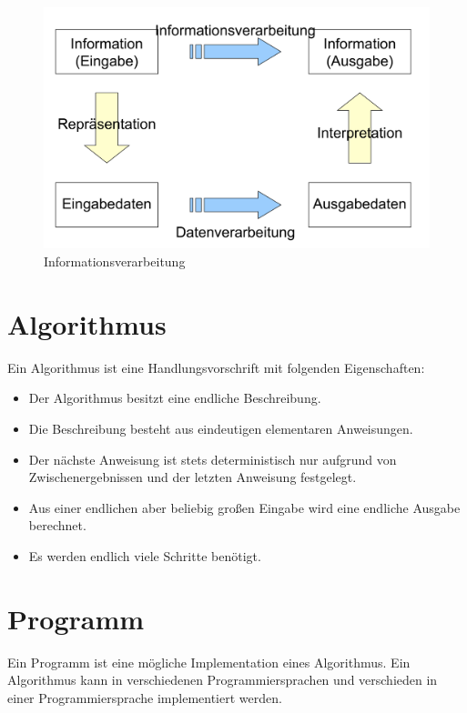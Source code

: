 \documentclass[../main.tex]{subfiles}
\begin{document}
        \begin{figure}
             \centering
             \includegraphics[width=\textwidth]{Abbildungen/Informationsverarbeitung.png}
             \caption{Informationsverarbeitung}
             \label{figure:Informatik:Grundlagen:informationsverarbeitung}
        \end{figure}
    
    \section{Algorithmus}
        Ein Algorithmus ist eine Handlungsvorschrift mit folgenden Eigenschaften:
        
        \begin{itemize}
            \item Der Algorithmus besitzt eine endliche Beschreibung.
            \item Die Beschreibung besteht aus eindeutigen elementaren Anweisungen.
            \item Der nächste Anweisung ist stets deterministisch nur aufgrund von Zwischenergebnissen und der letzten Anweisung festgelegt.
            \item Aus einer endlichen aber beliebig großen Eingabe wird eine endliche Ausgabe berechnet.
            \item Es werden endlich viele Schritte benötigt.
        \end{itemize}
    
    \section{Programm}
        Ein Programm ist eine mögliche Implementation eines Algorithmus. Ein Algorithmus kann in verschiedenen Programmiersprachen und verschieden in einer Programmiersprache implementiert werden.
        
\end{document}
